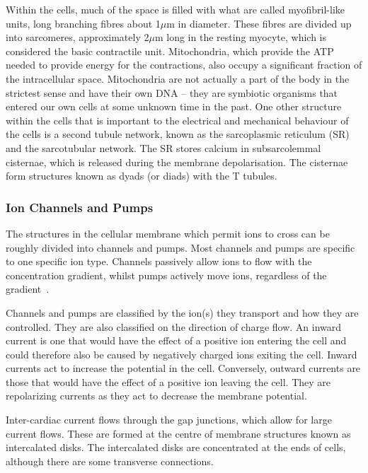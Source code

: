 Within the cells, much of the space is filled with what are called
myofibril-like units, long branching fibres about 1$\mu$m in diameter.
These fibres are divided up into sarcomeres, approximately 2$\mu$m long in the
resting myocyte, which is considered the basic contractile unit.
Mitochondria, which provide the ATP needed to provide energy for the
contractions, also occupy a significant fraction of the intracellular space.
Mitochondria are not actually a part of the body in the strictest sense and
have their own DNA -- they are symbiotic organisms that entered our own cells
at some unknown time in the past.
One other structure within the cells that is important to the electrical and
mechanical behaviour of the cells is a second tubule network, known as the
sarcoplasmic reticulum (SR) and the sarcotubular network.
The SR stores calcium in subsarcolemmal cisternae, which is released during the
membrane depolarisation.
The cisternae form structures known as dyads (or diads) with the T tubules.

\subsubsection{Ion Channels and Pumps}

The structures in the cellular membrane which permit ions to cross can
be roughly divided into channels and pumps.
Most channels and pumps are specific to one specific ion type.
Channels passively allow ions to flow with the concentration gradient, whilst
pumps actively move ions, regardless of the gradient~\cite{Hille2001}.

Channels and pumps are classified by the ion(s) they transport and how they are
controlled.
They are also classified on the direction of charge flow.
An inward current is one that would have the effect of a positive ion entering
the cell and could therefore also be caused by negatively charged ions exiting
the cell.
Inward currents act to increase the potential in the cell.
Conversely, outward currents are those that would have the effect of a positive
ion leaving the cell.
They are repolarizing currents as they act to decrease the membrane potential.

Inter-cardiac current flows through the gap junctions, which allow for large
current flows.
These are formed at the centre of membrane structures known as intercalated
disks.
The intercalated disks are concentrated at the ends of cells, although there are
some transverse connections.

